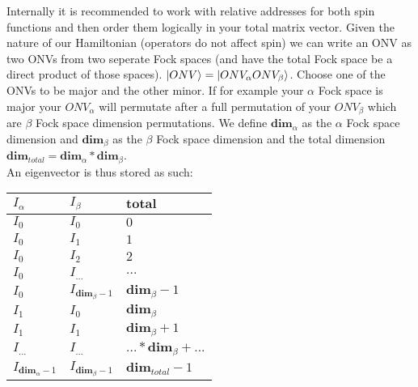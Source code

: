 \documentclass[12p]{article}
\begin{document}
Internally it is recommended to work with relative addresses for both spin functions and then order them logically in your total matrix vector. Given the nature of our Hamiltonian (operators do not affect spin) we can write an ONV as two ONVs from two seperate Fock spaces (and have the total Fock space be a direct product of those spaces). $\ket{ONV} = \ket{ONV_\alpha ONV_\beta}$. Choose one of the ONVs to be major and the other minor. If for example your $\alpha$ Fock space is major your $ONV_\alpha$ will permutate after a full permutation of your $ONV_\beta$ which are $\beta$ Fock space dimension permutations.
We define $\textbf{dim}_\alpha$ as the $\alpha$ Fock space dimension and $\textbf{dim}_\beta$ as the $\beta$ Fock space dimension and the total dimension $\textbf{dim}_{total} = \textbf{dim}_\alpha * \textbf{dim}_\beta$. \\
An eigenvector is thus stored as such:
\begin{tabular}{|l|l|l|}
\hline
$I_{\alpha}$ & $I_{\beta}$ & $\textbf{total}$ \\ \hline
$I_0$ & $I_0$ & $0$ \\ \hline
$I_0$ & $I_1$ & $1$ \\ \hline
$I_0$ & $I_2$ & $2$ \\ \hline
$I_0$ & $I_{...}$ & $...$ \\ \hline
$I_0$ & $I_{\textbf{dim}_\beta - 1}$ & $\textbf{dim}_\beta - 1$ \\ \hline
$I_1$ & $I_{0}$ & $\textbf{dim}_\beta$ \\ \hline
$I_1$ & $I_{1}$ & $\textbf{dim}_\beta + 1$ \\ \hline
$I_{...}$ & $I_{...}$ & $... * \textbf{dim}_\beta + ...$ \\ \hline
$I_{\textbf{dim}_\alpha - 1}$ & $I_{\textbf{dim}_\beta - 1}$ & $\textbf{dim}_{total} - 1$ \\ \hline
\end{tabular}
\end{document}
